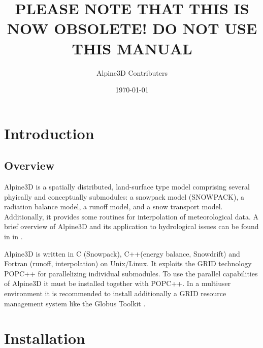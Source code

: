 \documentclass[12pt]{report}
\title{PLEASE NOTE THAT THIS IS NOW OBSOLETE! DO NOT USE THIS MANUAL}
\author{
  Alpine3D Contributers
}
\date{\today}
\begin{document}
\maketitle
\tableofcontents
\chapter{Introduction}\label{ch:intro}



\section{Overview}
Alpine3D is a spatially distributed, land-surface type model
comprising several phyically and conceptually submodules: a snowpack
model (SNOWPACK), a radiation balance model, a runoff model, and a
snow transport model. Additionally, it provides some routines for
interpolation of meteorological data. A brief overview of Alpine3D and
its application to hydrological issues can be found in in
\cite{lehning_2006}.

Alpine3D is written in C (Snowpack), C++(energy balance, Snowdrift) and
Fortran (runoff, interpolation) on Unix/Linux. It exploits the GRID
technology POPC++ \cite{popc} for parallelizing individual submodules.
To use the parallel capabilities of Alpine3D it must be installed
together with POPC++. In a multiuser environment it is recommended to
install additionally a GRID resource management system like the Globus
Toolkit \cite{gt}.







\chapter{Installation}\label{ch:installation}
\end{document}
